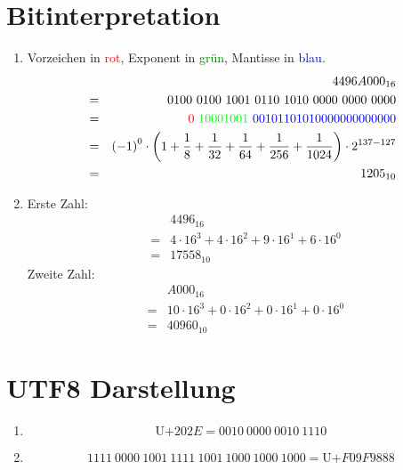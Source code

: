 \documentclass[DIN, pagenumber=false, fontsize=11pt, parskip=half]{scrartcl}
\begin{document}
    \section{Bitinterpretation}
    \begin{enumerate}[label=(\alph*)]
        \item Vorzeichen in \textcolor{red}{rot}, Exponent in \textcolor{green}{grün}, Mantisse in \textcolor{blue}{blau}.
            \begin{eqnarray*}
                &&{4496A000}_{16} \\&=&
                0100\ 0100\ 1001\ 0110\ 1010\ 0000\ 0000\ 0000 \\&=& 
                \textcolor{red}{0}\ \textcolor{green}{10001001}\ \textcolor{blue}{00101101010000000000000} \\&=&
                {(-1)}^0 \cdot \left(1+\frac{1}{8}+\frac{1}{32}+\frac{1}{64}+\frac{1}{256}+\frac{1}{1024}\right) \cdot 2^{137-127} \\&=&
                {1205}_{10}
            \end{eqnarray*}
        \item
            Erste Zahl:
            \begin{eqnarray*}
                &&{4496}_{16} \\&=&
                4 \cdot 16^3 + 4 \cdot 16^2 + 9 \cdot 16^1 + 6 \cdot 16^0 \\&=&
                {17558}_{10}
            \end{eqnarray*}
            Zweite Zahl:
            \begin{eqnarray*}
                &&{A000}_{16} \\&=&
                10 \cdot 16^3 + 0 \cdot 16^2 + 0 \cdot 16^1 + 0 \cdot 16^0 \\&=&
                {40960}_{10}
            \end{eqnarray*}
    \end{enumerate}
    \section{UTF8 Darstellung}
    \begin{enumerate}[label=(\alph*)]
        \item
            \begin{equation*}
                \text{U+}202E = 0010\ 0000\ 0010\ 1110
            \end{equation*}
        \item
            \begin{equation*}
                1111\ 0000\ 1001\ 1111\ 1001\ 1000\ 1000\ 1000 = \text{U+}F09F9888
            \end{equation*}
    \end{enumerate}
\end{document}
